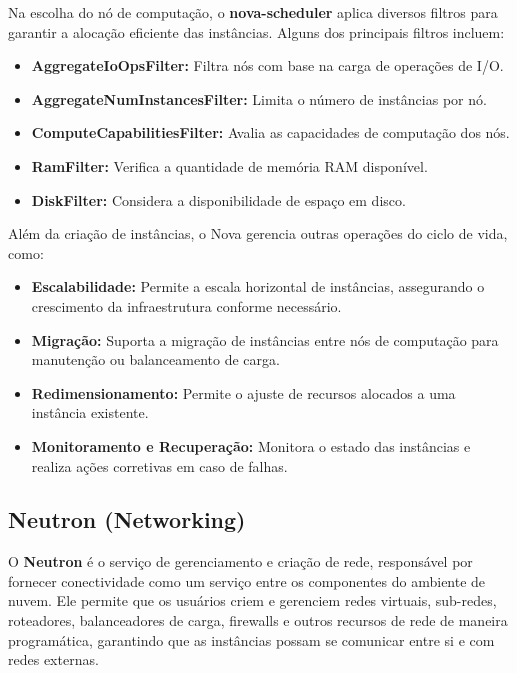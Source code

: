 Na escolha do nó de computação, o \textbf{nova-scheduler} aplica diversos filtros para garantir a alocação eficiente das instâncias. Alguns dos principais filtros incluem:

\begin{itemize}
    \item \textbf{AggregateIoOpsFilter:} Filtra nós com base na carga de operações de I/O.
    \item \textbf{AggregateNumInstancesFilter:} Limita o número de instâncias por nó.
    \item \textbf{ComputeCapabilitiesFilter:} Avalia as capacidades de computação dos nós.
    \item \textbf{RamFilter:} Verifica a quantidade de memória RAM disponível.
    \item \textbf{DiskFilter:} Considera a disponibilidade de espaço em disco.
\end{itemize}

Além da criação de instâncias, o Nova gerencia outras operações do ciclo de vida, como:

\begin{itemize}
    \item \textbf{Escalabilidade:} Permite a escala horizontal de instâncias, assegurando o crescimento da infraestrutura conforme necessário.
    \item \textbf{Migração:} Suporta a migração de instâncias entre nós de computação para manutenção ou balanceamento de carga.
    \item \textbf{Redimensionamento:} Permite o ajuste de recursos alocados a uma instância existente.
    \item \textbf{Monitoramento e Recuperação:} Monitora o estado das instâncias e realiza ações corretivas em caso de falhas.
\end{itemize}


\subsection{Neutron (Networking)}

O \textbf{Neutron} é o serviço de gerenciamento e criação de rede, responsável por fornecer conectividade como um serviço entre os componentes do ambiente de nuvem. Ele permite que os usuários criem e gerenciem redes virtuais, sub-redes, roteadores, balanceadores de carga, firewalls e outros recursos de rede de maneira programática, garantindo que as instâncias possam se comunicar entre si e com redes externas.

